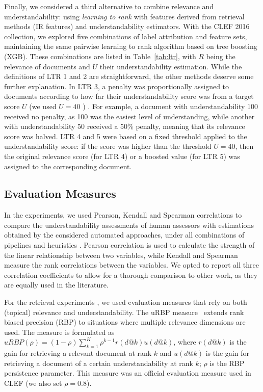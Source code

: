 \documentclass[10pt,a4paper]{article}
\begin{document}
Finally, we considered a third alternative to combine relevance and understandability: using \textit{learning to rank} with features derived from retrieval methods (IR features) and understandability estimators.
With the CLEF 2016 collection, we explored five combinations of label attribution and feature sets, maintaining the same pairwise learning to rank algorithm based on tree boosting (XGB).
These combinations are listed in Table~\ref{tab:ltr}, with $R$ being the relevance of documents and $U$ their understandability estimation. While the definitions of LTR 1 and 2 are straightforward, the other methods deserve some further explanation. In LTR 3, a penalty was proportionally assigned to documents according to how far their understandability score was from a target score $U$ (we used $U=40$ ) . For example, a document with understandability 100 received no penalty, as 100 was the easiest level of understanding, while another with understandability 50 received a 50\% penalty, meaning that its relevance score was halved. LTR 4 and 5 were based on a fixed threshold applied to the understandability score: if the score was higher than the threshold $U=40$, then the original relevance score (for LTR 4) or a boosted value (for LTR 5) was assigned to the corresponding document.



\subsection*{Evaluation Measures}

In the experiments, we used Pearson, Kendall and Spearman correlations to compare the understandability assessments of human assessors with estimations obtained by the considered automated approaches, under all combinations of pipelines and heuristics . Pearson correlation is used to calculate the strength of the linear relationship between two variables, while Kendall and Spearman measure the rank correlations between the variables. We opted to report all three correlation coefficients to allow for a thorough comparison to other work, as they are equally used in the literature. 

For the retrieval experiments , we used evaluation measures that rely on both (topical) relevance and understandability. 
The uRBP measure~\cite{zuccon2016understandability} extends rank biased precision (RBP) to situations where multiple relevance dimensions are used. The measure is formulated as $uRBP(\rho) = (1 - \rho) \sum_{k=1}^{K} \rho^{k-1} r(d@k) u(d@k)$, where $r(d@k)$ is the gain for retrieving a relevant document at rank $k$ and $u(d@k)$ is the gain for retrieving a document of a certain understandability at rank $k$; $\rho$ is the RBP persistence parameter. This measure was an official evaluation measure used in CLEF (we also set $\rho=0.8$). 
\end{document}
